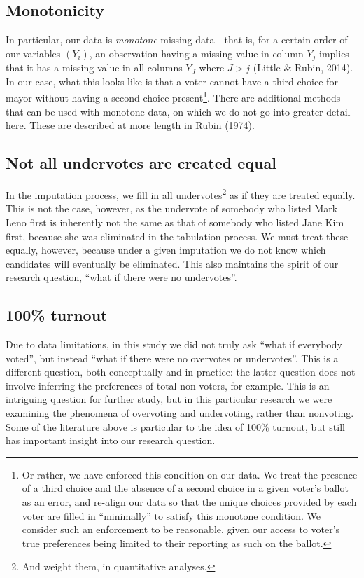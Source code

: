 \documentclass[12pt,twoside]{reedthesis}
\begin{document}
\hypertarget{monotonicity}{%
\subsection{Monotonicity}\label{monotonicity}}

In particular, our data is \emph{monotone} missing data - that is, for a certain order of our variables \((Y_i)\), an observation having a missing value in column \(Y_j\) implies that it has a missing value in all columns \(Y_J\) where \(J > j\) (Little \& Rubin, 2014). In our case, what this looks like is that a voter cannot have a third choice for mayor without having a second choice present\footnote{Or rather, we have enforced this condition on our data. We treat the presence of a third choice and the absence of a second choice in a given voter's ballot as an error, and re-align our data so that the unique choices provided by each voter are filled in ``minimally'' to satisfy this monotone condition. We consider such an enforcement to be reasonable, given our access to voter's true preferences being limited to their reporting as such on the ballot.}. There are additional methods that can be used with monotone data, on which we do not go into greater detail here. These are described at more length in Rubin (1974).

\hypertarget{not-all-undervotes-are-created-equal}{%
\subsection{Not all undervotes are created equal}\label{not-all-undervotes-are-created-equal}}

In the imputation process, we fill in all undervotes\footnote{And weight them, in quantitative analyses.} as if they are treated equally. This is not the case, however, as the undervote of somebody who listed Mark Leno first is inherently not the same as that of somebody who listed Jane Kim first, because she was eliminated in the tabulation process. We must treat these equally, however, because under a given imputation we do not know which candidates will eventually be eliminated. This also maintains the spirit of our research question, ``what if there were no undervotes''.

\hypertarget{turnout}{%
\subsection{100\% turnout}\label{turnout}}

Due to data limitations, in this study we did not truly ask ``what if everybody voted'', but instead ``what if there were no overvotes or undervotes''. This is a different question, both conceptually and in practice: the latter question does not involve inferring the preferences of total non-voters, for example. This is an intriguing question for further study, but in this particular research we were examining the phenomena of overvoting and undervoting, rather than nonvoting. Some of the literature above is particular to the idea of 100\% turnout, but still has important insight into our research question.
\end{document}
